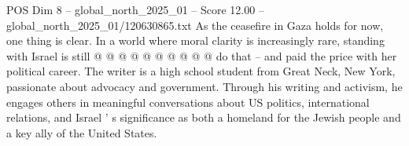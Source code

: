 \begin{textsample}{POS Dim 8 – global\_north\_2025\_01 – Score 12.00 – global\_north\_2025\_01/120630865.txt}
As the ceasefire in Gaza holds for now, one thing is clear.
In a world where moral clarity is increasingly rare, standing with Israel is still @ @ @ @ @ @ @ @ @ @ do that -- and paid the price with her political career.
The writer is a high school student from Great Neck, New York, passionate about advocacy and government.
Through his writing and activism, he engages others in meaningful conversations about US politics, international relations, and Israel ' s significance as both a homeland for the Jewish people and a key ally of the United States.

\end{textsample}
